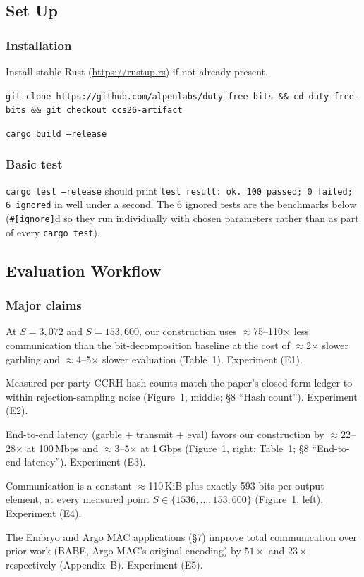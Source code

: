 \documentclass[nonacm,sigconf]{acmart}
\begin{document}
\subsection{Set Up}

\subsubsection{Installation}
\begin{compactenum}
\item Install stable Rust (\url{https://rustup.rs}) if not already present.
\item \texttt{git clone https://github.com/alpenlabs/duty-free-bits \&\& cd duty-free-bits \&\& git checkout ccs26-artifact}
\item \texttt{cargo build --release}
\end{compactenum}

\subsubsection{Basic test}
\texttt{cargo test --release} should print \texttt{test result: ok. 100
passed; 0 failed; 6 ignored} in well under a second. The 6 ignored tests are
the benchmarks below (\texttt{\#[ignore]}d so they run individually with
chosen parameters rather than as part of every \texttt{cargo test}).

\subsection{Evaluation Workflow}

\subsubsection{Major claims}
\begin{compactitem}
\item[(C1):] At $S=3{,}072$ and $S=153{,}600$, our construction uses
  $\approx$75--110$\times$ less communication than the bit-decomposition
  baseline at the cost of $\approx$2$\times$ slower garbling and
  $\approx$4--5$\times$ slower evaluation (Table~1). Experiment (E1).
\item[(C2):] Measured per-party CCRH hash counts match the paper's
  closed-form ledger to within rejection-sampling noise (Figure~1,
  middle; \S8 ``Hash count''). Experiment (E2).
\item[(C3):] End-to-end latency (garble + transmit + eval) favors our
  construction by $\approx$22--28$\times$ at 100\,Mbps and
  $\approx$3--5$\times$ at 1\,Gbps (Figure~1, right; Table~1; \S8
  ``End-to-end latency''). Experiment (E3).
\item[(C4):] Communication is a constant $\approx$110\,KiB plus exactly
  593 bits per output element, at every measured point $S\in\{1536,\ldots,
  153{,}600\}$ (Figure~1, left). Experiment (E4).
\item[(C5):] The Embryo and Argo MAC applications (\S7) improve total
  communication over prior work (BABE, Argo MAC's original encoding) by
  $51\times$ and $23\times$ respectively (Appendix~B). Experiment (E5).
\end{compactitem}
\end{document}
